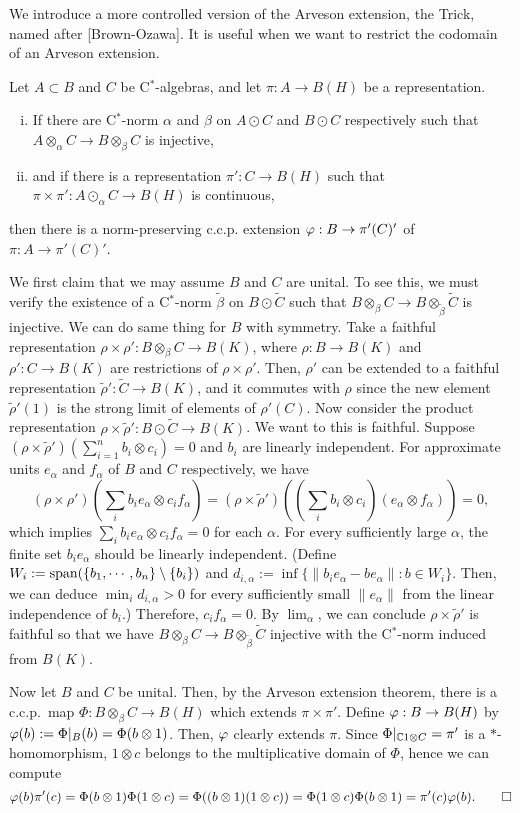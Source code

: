 \documentclass{../../../small}
\begin{document}
We introduce a  more controlled version of the Arveson extension, the Trick, named after [Brown-Ozawa].
It is useful when we want to restrict the codomain of an Arveson extension.
\begin{thm}
Let $A\subset B$ and $ C$ be C$^*$-algebras, and let $\pi:A\to B(H)$ be a representation.
\begin{enumerate}[(i)]
\item If there are C$^*$-norm $\alpha$ and $\beta$ on $A\odot C$ and $B\odot C$ respectively such that $A\otimes_\alpha C\to B\otimes_\beta C$ is injective,
\item and if there is a representation $\pi': C\to B(H)$ such that $\pi\times\pi':A\odot_\alpha C\to B(H)$ is continuous,
\end{enumerate}
then there is a norm-preserving c.c.p. extension $\varphi: B\to\pi'( C)'$ of $\pi:A\to\pi'( C)'$.
\end{thm}
\begin{pf}
We first claim that we may assume $B$ and $ C$ are unital.
To see this, we must verify the existence of a C$^*$-norm $\tilde\beta$ on $B\odot\tilde C$ such that $B\otimes_\beta C\to B\otimes_{\tilde\beta}\tilde C$ is injective.
We can do same thing for $B$ with symmetry.
Take a faithful representation $\rho\times\rho': B\otimes_\beta C\to B(K)$, where $\rho: B\to B(K)$ and $\rho': C\to B(K)$ are restrictions of $\rho\times\rho'$.
Then, $\rho'$ can be extended to a faithful representation $\tilde\rho':\tilde C\to B(K)$, and it commutes with $\rho$ since the new element $\tilde\rho'(1)$ is the strong limit of elements of $\rho'( C)$.
Now consider the product representation $\rho\times\tilde\rho': B\odot\tilde C\to B(K)$.
We want to this is faithful.
Suppose $(\rho\times\tilde\rho')(\sum_{i=1}^nb_i\otimes c_i)=0$ and $b_i$ are linearly independent.
For approximate units $e_\alpha$ and $f_\alpha$ of $B$ and $ C$ respectively, we have
\[(\rho\times\rho')(\sum_ib_ie_\alpha\otimes c_if_\alpha)=(\rho\times\tilde\rho')((\sum_ib_i\otimes c_i)(e_\alpha\otimes f_\alpha))=0,\]
which implies $\sum_ib_ie_\alpha\otimes c_if_\alpha=0$ for each $\alpha$.
For every sufficiently large $\alpha$, the finite set $b_ie_\alpha$ should be linearly independent.
(Define $W_i:=\operatorname{span}(\{b_1,\cdots,b_n\}\setminus\{b_i\})$ and $d_{i,\alpha}:=\inf\{\|b_ie_\alpha-be_\alpha\|:b\in W_i\}$. Then, we can deduce $\min_id_{i,\alpha}>0$ for every sufficiently small $\|e_\alpha\|$ from the linear independence of $b_i$.)
Therefore, $c_if_\alpha=0$.
By $\lim_\alpha$, we can conclude $\rho\times\tilde\rho'$ is faithful so that we have $B\otimes_\beta C\to B\otimes_{\tilde\beta}\tilde C$ injective with the C$^*$-norm induced from $B(K)$.

Now let $B$ and $ C$ be unital.
Then, by the Arveson extension theorem, there is a c.c.p.~map $\Phi: B\otimes_\beta C\to B(H)$ which extends $\pi\times\pi'$.
Define $\varphi: B\to B(H)$ by $\varphi(b):=\Phi|_ B(b)=\Phi(b\otimes1)$.
Then, $\varphi$ clearly extends $\pi$.
Since $\Phi|_{\mathbb{C}1\otimes C}=\pi'$ is a $*$-homomorphism, $1\otimes c$ belongs to the multiplicative domain of $\Phi$, hence we can compute
\[\varphi(b)\pi'(c)=\Phi(b\otimes1)\Phi(1\otimes c)=\Phi((b\otimes1)(1\otimes c))=\Phi(1\otimes c)\Phi(b\otimes1)=\pi'(c)\varphi(b).\qedhere\]
\end{pf}
\end{document}
